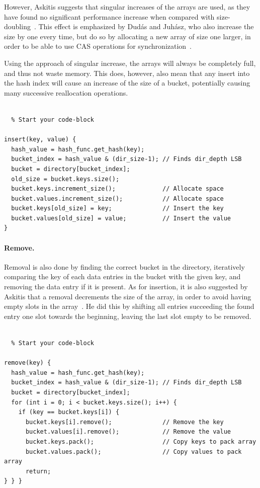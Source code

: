 \documentclass[11pt]{article} %
\begin{document}
However, Askitis suggests that singular increases of the arrays are used, as they have found no significant performance increase when compared with size-doubling~\cite{NA09}. This effect is emphasized by Dudás and Juhász, who also increase the size by one every time, but do so by allocating a new array of size one larger, in order to be able to use CAS operations for synchronization~\cite{ADSJ13}. 

Using the approach of singular increase, the arrays will always be completely full, and thus not waste  memory. This does, however, also mean that any insert into the hash index will cause an increase of the size of a bucket, potentially causing many successive reallocation operations. \\
\\
\begin{fminipage}{\linewidth}
\begin{lstlisting}  % Start your code-block

insert(key, value) {
  hash_value = hash_func.get_hash(key);
  bucket_index = hash_value & (dir_size-1); // Finds dir_depth LSB
  bucket = directory[bucket_index];
  old_size = bucket.keys.size();
  bucket.keys.increment_size();             // Allocate space
  bucket.values.increment_size();           // Allocate space
  bucket.keys[old_size] = key;              // Insert the key
  bucket.values[old_size] = value;          // Insert the value
}
\end{lstlisting}
\end{fminipage}

\paragraph{Remove.} Removal is also done by finding the correct bucket in the directory, iteratively comparing the key of each data entries in the bucket with the given key, and removing the data entry if it is present. As for insertion, it is also suggested by Askitis that a removal decrements the size of the array, in order to avoid having empty slots in the array~\cite{NA09}. He did this by shifting all entries succeeding the found entry one slot towards the beginning, leaving the last slot empty to be removed. \\
\\
\begin{fminipage}{\linewidth}
\begin{lstlisting}  % Start your code-block

remove(key) {
  hash_value = hash_func.get_hash(key);
  bucket_index = hash_value & (dir_size-1); // Finds dir_depth LSB
  bucket = directory[bucket_index];
  for (int i = 0; i < bucket.keys.size(); i++) {
    if (key == bucket.keys[i]) {
      bucket.keys[i].remove();              // Remove the key
      bucket.values[i].remove();            // Remove the value
      bucket.keys.pack();                   // Copy keys to pack array
      bucket.values.pack();                 // Copy values to pack array
      return;
} } }
\end{lstlisting}
\end{fminipage}
\end{document}
